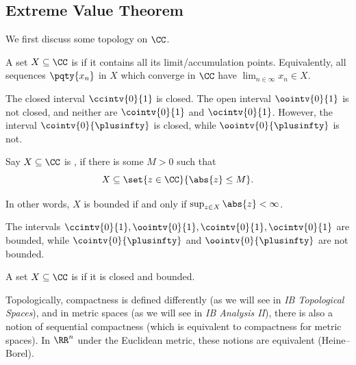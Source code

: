 \subsection{Extreme Value Theorem}

We first discuss some topology on \(\CC\).

\begin{definition}
    \label{def:closed-set-c}%
    A set \(X \subseteq \CC\) is  if it contains all its limit/accumulation points. Equivalently, all sequences \(\pqty{x_n}\) in \(X\) which converge in \(\CC\) have \(\lim_{n \in \infty} x_n \in X\).
\end{definition}

\begin{examples}
    \label{ex:closed-set-r}%
    The closed interval \(\ccintv{0}{1}\) is closed. The open interval \(\oointv{0}{1}\) is not closed, and neither are \(\cointv{0}{1}\) and \(\ocintv{0}{1}\). However, the interval \(\cointv{0}{\plusinfty}\) is closed, while \(\oointv{0}{\plusinfty}\) is not.
\end{examples}

\begin{definition}
    \label{def:bounded-set-c}%
    Say \(X \subseteq \CC\) is , if there is some \(M > 0\) such that
    \[
        X \subseteq \set{z \in \CC}{\abs{z} \leq M}.
    \]

    In other words, \(X\) is bounded if and only if \(\sup_{z \in X} \abs{z} < \infty\).
\end{definition}

\begin{examples}
    \label{ex:bounded-set-r}%
    The intervals \(\ccintv{0}{1}, \oointv{0}{1}, \cointv{0}{1}, \ocintv{0}{1}\) are bounded, while \(\cointv{0}{\plusinfty}\) and \(\oointv{0}{\plusinfty}\) are not bounded.
\end{examples}

\begin{definition}
    \label{def:compact-set}%
    A set \(X \subseteq \CC\) is  if it is closed and bounded.
\end{definition}

\begin{remark}
    Topologically, compactness is defined differently (as we will see in \textit{IB Topological Spaces}), and in metric spaces (as we will see in \textit{IB Analysis II}), there is also a notion of sequential compactness (which is equivalent to compactness for metric spaces). In \(\RR^n\) under the Euclidean metric, these notions are equivalent (Heine--Borel).
\end{remark}

